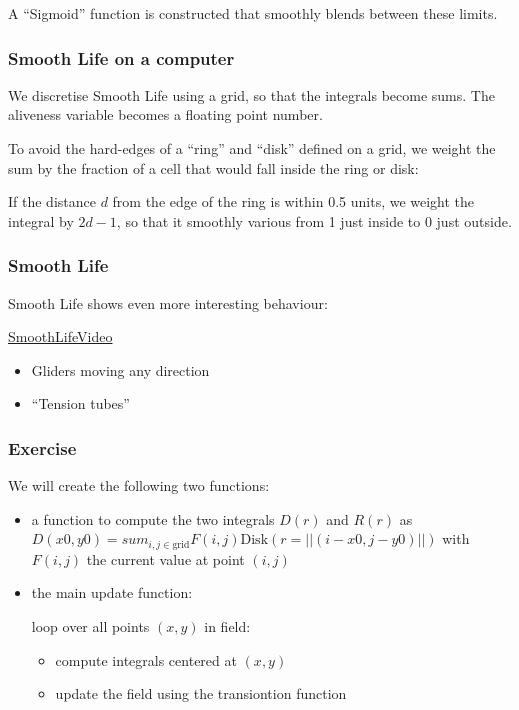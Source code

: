 A ``Sigmoid'' function is constructed that smoothly blends between these
limits.

\subsubsection{Smooth Life on a
computer}\label{smooth-life-on-a-computer}

We discretise Smooth Life using a grid, so that the integrals become
sums. The aliveness variable becomes a floating point number.

To avoid the hard-edges of a ``ring'' and ``disk'' defined on a grid, we
weight the sum by the fraction of a cell that would fall inside the ring
or disk:

If the distance $d$ from the edge of the ring is within 0.5 units, we
weight the integral by $2d-1$, so that it smoothly various from 1 just
inside to 0 just outside.

\subsubsection{Smooth Life}\label{smooth-life-3}

Smooth Life shows even more interesting behaviour:

\href{https://www.youtube.com/watch?v=KJe9H6qS82I}{SmoothLifeVideo}

\begin{itemize}
\itemsep1pt\parskip0pt
\item
  Gliders moving any direction
\item
  ``Tension tubes''
\end{itemize}

\subsubsection{Exercise}\label{exercise-1}

We will create the following two functions:

\begin{itemize}
\item
  a function to compute the two integrals $D(r)$ and $R(r)$ as
  $D(x0, y0) = sum_{i, j \in \mathrm{grid}} F(i, j) \mathrm{Disk}(r=||(i - x0, j - y0)||)$
  with $F(i, j)$ the current value at point $(i, j)$
\item
  the main update function:

  loop over all points $(x, y)$ in field:

  \begin{itemize}
  \itemsep1pt\parskip0pt
  \item
    compute integrals centered at $(x, y)$
  \item
    update the field using the transiontion function
  \end{itemize}
\end{itemize}

